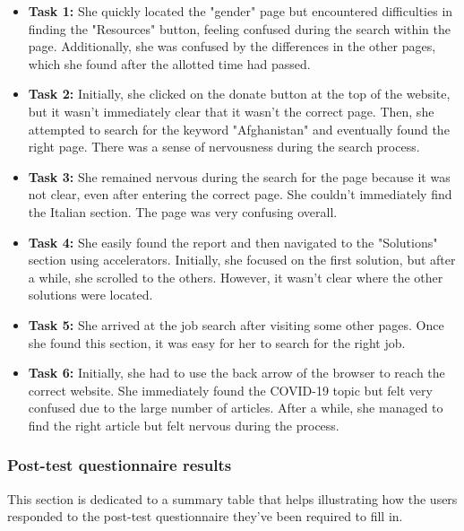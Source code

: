 \begin{itemize}
    \item \textbf{Task 1:} She quickly located the "gender" page but encountered difficulties in finding the "Resources" button, feeling confused during the search within the page. Additionally, she was confused by the differences in the other pages, which she found after the allotted time had passed.
    \item \textbf{Task 2:} Initially, she clicked on the donate button at the top of the website, but it wasn't immediately clear that it wasn't the correct page. Then, she attempted to search for the keyword "Afghanistan" and eventually found the right page. There was a sense of nervousness during the search process.
    \item \textbf{Task 3:} She remained nervous during the search for the page because it was not clear, even after entering the correct page. She couldn't immediately find the Italian section. The page was very confusing overall.
    \item \textbf{Task 4:} She easily found the report and then navigated to the "Solutions" section using accelerators. Initially, she focused on the first solution, but after a while, she scrolled to the others. However, it wasn't clear where the other solutions were located.
    \item \textbf{Task 5:} She arrived at the job search after visiting some other pages. Once she found this section, it was easy for her to search for the right job.
    \item \textbf{Task 6:} Initially, she had to use the back arrow of the browser to reach the correct website. She immediately found the COVID-19 topic but felt very confused due to the large number of articles. After a while, she managed to find the right article but felt nervous during the process.
\end{itemize}


\clearpage




\subsubsection*{Post-test questionnaire results}
This section is dedicated to a summary table that helps illustrating how the users responded to the post-test questionnaire they've been required to fill in.\\

